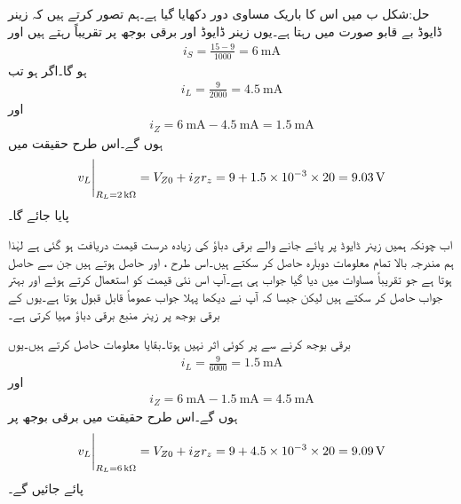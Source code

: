 حل:شکل  ب میں اس کا باریک مساوی دور دکھایا گیا ہے۔ہم تصور کرتے ہیں کہ زینر ڈایوڈ بے قابو صورت میں رہتا ہے۔یوں زینر ڈایوڈ اور برقی بوجھ پر تقریباً  رہتے ہیں اور
\begin{align*}
i_S=\frac{15-9}{1000}=\SI{6}{\milli \ampere}
\end{align*}
ہو گا۔اگر  ہو تب
\begin{align*}
i_L=\frac{9}{2000}=\SI{4.5}{\milli \ampere}
\end{align*}
اور
\begin{align*}
i_Z=\SI{6}{\milli \ampere}-\SI{4.5}{\milli \ampere}=\SI{1.5}{\milli \ampere}
\end{align*}
ہوں گے۔اس طرح حقیقت میں
\begin{align}\label{مساوات_ڈایوڈ_زینر_منبع_جواب}
\eval{v_{L}}_{R_L=\SI{2}{\kilo \ohm}}=V_{Z0}+i_Z r_z=9+1.5 \times 10^{-3} \times 20=\SI{9.03}{\volt}
\end{align}
پایا جائے گا۔

اب چونکہ ہمیں زینر ڈایوڈ پر پائے جانے والے برقی دباؤ کی زیادہ درست قیمت دریافت ہو گئی ہے لہٰذا ہم مندرجہ بالا تمام معلومات دوبارہ حاصل کر سکتے  ہیں۔اس طرح ،   اور  حاصل ہوتے ہیں جن سے  حاصل ہوتا ہے جو تقریباً مساوات  میں دیا گیا جواب ہی ہے۔آپ اس نئی قیمت کو استعمال کرتے ہوئے اور بہتر جواب حاصل کر سکتے ہیں لیکن جیسا کہ آپ نے دیکھا پہلا جواب عموماً قابل قبول ہوتا ہے۔یوں  کے برقی بوجھ پر زینر منبع  برقی دباؤ مہیا کرتی ہے۔

برقی بوجھ  کرنے سے  پر کوئی اثر نہیں ہوتا۔بقایا معلومات حاصل کرتے ہیں۔یوں
\begin{align*}
i_L=\frac{9}{6000}=\SI{1.5}{\milli \ampere}
\end{align*}
اور
\begin{align*}
i_Z=\SI{6}{\milli \ampere}-\SI{1.5}{\milli \ampere}=\SI{4.5}{\milli \ampere}
\end{align*}
ہوں گے۔اس طرح حقیقت میں برقی بوجھ پر
\begin{align}\label{مساوات_ڈایوڈ_زینر_منبع_جواب_الف}
\eval{v_{L}}_{R_L=\SI{6}{\kilo \ohm}}=V_{Z0}+i_Z r_z=9+4.5 \times 10^{-3} \times 20=\SI{9.09}{\volt}
\end{align}
پائے جائیں گے۔

